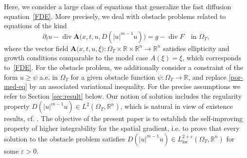 \documentclass[a4paper, 10pt, american]{amsart}
\numberwithin{theorem}{section}
\numberwithin{equation}{section}
\def\R{\mathbb{R}}
\DeclareMathOperator{\Div}{div}
\newcommand{\eps}{\varepsilon}
\begin{document}
Here, we consider a large class of equations that generalize the fast diffusion
equation~\eqref{FDE}. 
More precisely, we deal
with obstacle problems related to equations of the kind
\begin{equation}\label{por-med-eq}
  \partial_t u -\Div \mathbf A\big(x,t,u,D(|u|^{m-1}u)\big) =g-\Div F
  \quad\mbox{in $\Omega_T$}, 
\end{equation}
where the vector field $\mathbf
A\big(x,t,u,\xi):\Omega_T\times\R\times\R^n\to\R^n$ satisfies ellipticity and
growth conditions comparable to the model case $A(\xi)=\xi$, which
corresponds to~\eqref{FDE}.
For the obstacle problem, we additionally consider a constraint of the
form $u\ge\psi$ a.e. in $\Omega_T$ for a given obstacle function
$\psi:\Omega_T\to\R$, and replace \eqref{por-med-eq} by an associated
variational inequality. 
For the precise assumptions we refer to 
Section \ref{sec:result} below.
Our notion of solution includes the regularity property
$D(|u|^{m-1}u)\in L^2(\Omega_T,\R^n)$, which is natural in view of
existence results, cf. \cite{BLS:MathAnn05,AltLuckhaus}. The objective of the
present paper is to establish the self-improving property of higher
integrability for the spatial gradient, i.e. to prove that every
solution to the obstacle problem satisfies
$D(|u|^{m-1}u)\in L^{2+\eps}_{\mathrm{loc}}(\Omega_T,\R^n)$ for some $\eps>0$.
\end{document}
